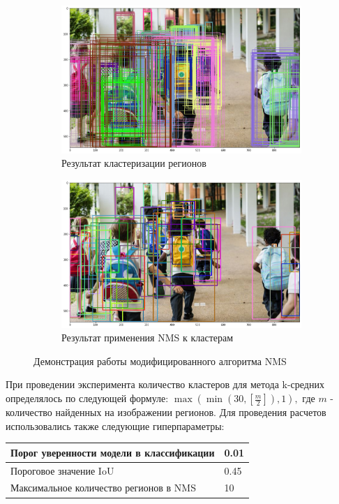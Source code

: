 \documentclass[a4paper,14pt]{article}
\begin{document}
    \begin{figure}[H]
    	\centering
    	\begin{subfigure}{.5\textwidth}
    		\centering
    		\includegraphics[width=\linewidth]{images/before_nms}
    		\caption{Результат кластеризации регионов}
    		\label{fig:nms1}
    	\end{subfigure}%
    	\begin{subfigure}{.5\textwidth}
    		\centering
    		\includegraphics[width=\linewidth]{images/after_nms}
    		\caption{Результат применения NMS к кластерам}
    		\label{fig:nms2}
    	\end{subfigure}
    	\caption{Демонстрация работы модифицированного алгоритма NMS}
    	\label{fig:nms}
    \end{figure}
    
    При проведении эксперимента количество кластеров для метода k-средних определялось по следующей формуле:
    $\max(\min(30, \left[\frac{m}{2}\right]), 1),$ где $m$ - количество найденных на изображении регионов. 
    Для проведения расчетов использовались также следующие гиперпараметры:
    \begin{center}
    	\begin{tabular}{| l | l |}
    		\hline
    		Порог уверенности модели в классификации & 0.01\\ \hline
    		Пороговое значение IoU & 0.45 \\ \hline
    		Максимальное количество регионов в NMS  & 10\\
    		\hline
    	\end{tabular}
    \end{center}
\end{document}
